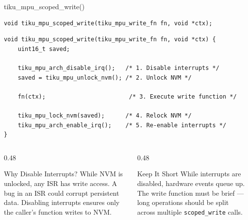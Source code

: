 \documentclass[aspectratio=169, 10pt]{beamer}
\begin{document}
\begin{frame}[fragile]{tiku\_mpu\_scoped\_write()}
\begin{lstlisting}[style=cstyle]
void tiku_mpu_scoped_write(tiku_mpu_write_fn fn, void *ctx);
\end{lstlisting}

\begin{lstlisting}[style=cstyle, title={kernel/memory/tiku\_mpu.c}]
void tiku_mpu_scoped_write(tiku_mpu_write_fn fn, void *ctx) {
    uint16_t saved;

    tiku_mpu_arch_disable_irq();   /* 1. Disable interrupts */
    saved = tiku_mpu_unlock_nvm(); /* 2. Unlock NVM */

    fn(ctx);                        /* 3. Execute write function */

    tiku_mpu_lock_nvm(saved);      /* 4. Relock NVM */
    tiku_mpu_arch_enable_irq();    /* 5. Re-enable interrupts */
}
\end{lstlisting}

\vspace{0.3em}
\begin{columns}[T]
\begin{column}{0.48\textwidth}
\begin{alertblock}{Why Disable Interrupts?}
While NVM is unlocked, any ISR has write access.
A bug in an ISR could corrupt persistent data.
Disabling interrupts ensures only the caller's
function writes to NVM.
\end{alertblock}
\end{column}
\begin{column}{0.48\textwidth}
\begin{alertblock}{Keep It Short}
While interrupts are disabled, hardware events
queue up. The write function must be brief ---
long operations should be split across multiple
\texttt{scoped\_write} calls.
\end{alertblock}
\end{column}
\end{columns}
\end{frame}
\end{document}
